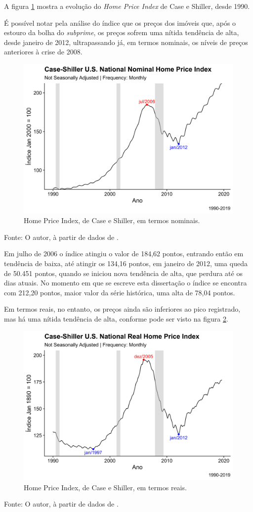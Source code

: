 \documentclass[
	12pt,				%
	oneside,			%
	a4paper,			%
	chapter=TITLE,		%
	section=TITLE,		%
	english,			%
	brazil				%
	]{abntex2}
\newcommand{\bcenter}{\begin{center}}
\newcommand{\ecenter}{\end{center}}
\begin{document}
A figura \ref{fig:nhpi} mostra a evolução do \emph{Home Price Index} de
Case e Shiller, desde 1990.

É possível notar pela análise do índice que os preços dos imóveis que,
após o estouro da bolha do \emph{subprime}, os preços sofrem uma nítida
tendência de alta, desde janeiro de 2012, ultrapassando já, em termos
nominais, os níveis de preços anteriores à crise de 2008.
\begin{figure}[H]

{\centering \includegraphics[width=0.7\linewidth]{images/nhpi-1} 

}

\caption{Home Price Index, de Case e Shiller, em termos nominais.}\label{fig:nhpi}
\end{figure}
\bcenter
Fonte: O autor, à partir de dados de \textcite{QuandlWIKI}. \ecenter

Em julho de 2006 o índice atingiu o valor de 184,62 pontos, entrando
então em tendência de baixa, até atingir os 134,16 pontos, em janeiro de
2012, uma queda de 50.451 pontos, quando se iniciou nova tendência de
alta, que perdura até os dias atuais. No momento em que se escreve esta
dissertação o índice se encontra com 212,20 pontos, maior valor da série
histórica, uma alta de 78,04 pontos.

Em termos reais, no entanto, os preços ainda são inferiores ao pico
registrado, mas há uma nítida tendência de alta, conforme pode ser visto
na figura \ref{fig:rhpi}.
\begin{figure}[H]

{\centering \includegraphics[width=0.7\linewidth]{images/rhpi-1} 

}

\caption{Home Price Index, de Case e Shiller, em termos reais.}\label{fig:rhpi}
\end{figure}
\bcenter
Fonte: O autor, à partir de dados de \textcite{QuandlWIKI}. \ecenter
\end{document}
